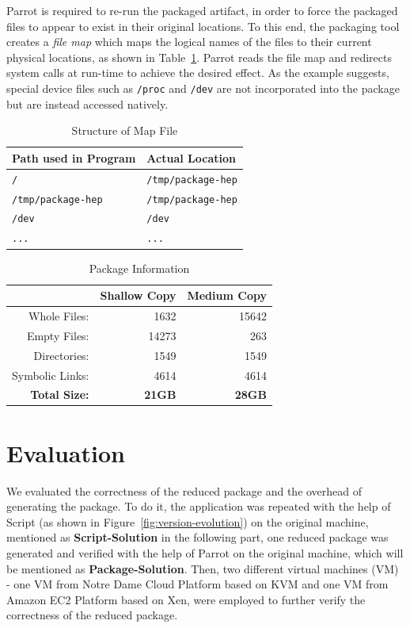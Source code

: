 \documentclass{sig-alternate}
\begin{document}
Parrot is required to re-run the packaged artifact, in order to force
the packaged files to appear to exist in their original locations.
To this end, the packaging tool creates a \emph{file map} which maps
the logical names of the files to their current physical locations, as shown in Table~\ref{table:map-file}.
Parrot reads the file map and redirects system calls at run-time to achieve the desired effect.
As the example suggests, special device files such as {\tt /proc} and {\tt /dev}
are not incorporated into the package but are instead accessed natively.

\begin{table}
    \centering
    \begin{tabular}{|l|l|}
    \hline
    \bf Path used in Program & \bf Actual Location \\ \hline
    {\tt /} & {\tt /tmp/package-hep} \\ \hline
    {\tt /tmp/package-hep} & {\tt /tmp/package-hep} \\ \hline
    {\tt /dev} & {\tt /dev} \\ \hline
    {\tt ...} & {\tt ...}\\ \hline
    \end{tabular}
    \caption{Structure of Map File}
    \label{table:map-file}
\end{table}

\begin{table}
    \centering
    \begin{tabular}{|r|r|r|}
\hline
                    & \bf Shallow Copy & \bf Medium Copy\\
\hline
    Whole Files:    & 1632         & 15642\\ 
\hline
    Empty Files:    & 14273        & 263\\
\hline
    Directories:    & 1549         & 1549\\ 
\hline
    Symbolic Links: & 4614         & 4614 \\
\hline
    \bf Total Size: & \bf 21GB     & \bf 28GB \\ 
\hline
    \end{tabular}
    \caption{Package Information}
    \label{table:package-info}
\end{table}


\section{Evaluation}

We evaluated the correctness of the reduced package and the overhead of generating the package.
To do it, the application was repeated with the help of Script (as shown in Figure~\ref{fig:version-evolution}) on the original machine, mentioned as {\bf Script-Solution} in the following part, 
one reduced package was generated and verified with the help of Parrot on the original machine, which will be mentioned as {\bf Package-Solution}.
Then, two different virtual machines (VM) - one VM from Notre Dame Cloud Platform based on KVM and one VM from Amazon EC2 Platform based on Xen, were employed to further verify the correctness of the reduced package.
\end{document}
